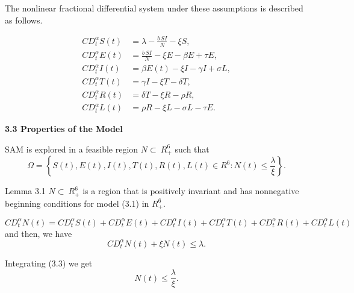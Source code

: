 \documentclass[10pt]{NSP1}
\begin{document}
	The nonlinear fractional differential system under these assumptions is described as follows.
	
	\[
	\begin{aligned}
		CD_{t}^{\alpha} S(t) &= \lambda - \frac{b\,S I}{N} - \xi S, \\
		CD_{t}^{\alpha} E(t) &= \frac{b\,S I}{N} - \xi E - \beta E + \tau E, \\
		CD_{t}^{\alpha} I(t) &= \beta E(t) - \xi I - \gamma I + \sigma L, \\
		CD_{t}^{\alpha} T(t) &= \gamma I - \xi T - \delta T, \\
		CD_{t}^{\alpha} R(t) &= \delta T - \xi R - \rho R, \\
		CD_{t}^{\alpha} L(t) &= \rho R - \xi L - \sigma L - \tau E.
	\end{aligned} \tag{3.1}
	\]
	
	\par\vspace{14.0pt}\noindent \begin{center}\large\bfseries 3.3 Properties of the Model\end{center}\vspace{14.0pt}
	
	\par\vspace{14.0pt}\vspace{14.0pt}
	
	SAM is explored in a feasible region \(N \subset \ R_{+}^{6}\) such that
	\[
	\Omega = \left\{ S(t),E(t),I(t),T(t),R(t),L(t)\in R^{6}: N(t) \leq \frac{\lambda}{\xi} \right\}. \tag{3.2}
	\]
	
	Lemma 3.1 \(N \subset \ R_{+}^{6}\) is a region that is positively invariant and has nonnegative beginning conditions for model (3.1) in \(R_{+}^{6}.\)
	
	\par\vspace{14.0pt}\vspace{14.0pt}
	
	\[
	CD_{t}^{\alpha} N(t) = CD_{t}^{\alpha} S(t) + CD_{t}^{\alpha} E(t) + CD_{t}^{\alpha} I(t) + CD_{t}^{\alpha} T(t) + CD_{t}^{\alpha} R(t) + CD_{t}^{\alpha} L(t)
	\]
	and then, we have
	\[
	CD_{t}^{\alpha} N(t) + \xi N(t) \leq \lambda. \tag{3.3}
	\]
	
	Integrating (3.3) we get
	\[
	N(t) \leq \frac{\lambda}{\xi}. \tag{3.4}
	\]
	
\end{document}

